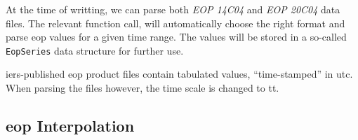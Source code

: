 At the time of writting, we can parse both \emph{EOP 14C04} and \emph{EOP 20C04} data files. 
The relevant function call, will automatically choose the right format and parse 
\gls{eop} values for a given time range. The values will be stored in a so-called 
\texttt{EopSeries} data structure for further use.

\begin{warning}
\gls{iers}-published \gls{eop} product files contain tabulated values, ``time-stamped'' 
in \gls{utc}. When parsing the files however, the time scale is changed to \gls{tt}.
\end{warning}

\subsection{\gls{eop} Interpolation}\label{ssec:eop-interpolation}

%  

